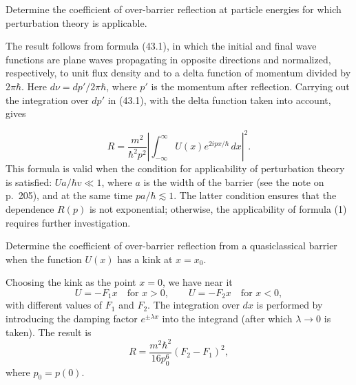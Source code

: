  Determine the coefficient of over-barrier reflection at
particle energies for which perturbation theory is applicable.

\SolutionHeading The result follows from formula (43.1), in which
the initial and final wave functions are plane waves propagating in opposite
directions and normalized, respectively, to unit flux density and to a delta
function of momentum divided by $2\pi\hbar$. Here $d\nu=dp'/2\pi\hbar$, where
$p'$ is the momentum after reflection. Carrying out the integration over
$dp'$ in (43.1), with the delta function taken into account, gives

\begin{equation}
 R=\frac{m^2}{\hbar^2p^2}
 \left|\int_{-\infty}^{\infty}U(x)e^{2ipx/\hbar}\,dx\right|^2.
 \tag{1}
\end{equation}
This formula is valid when the condition for applicability of perturbation
theory is satisfied: $Ua/\hbar v\ll1$, where $a$ is the width of the barrier
(see the note on p.~205), and at the same time $pa/\hbar\lesssim1$. The latter
condition ensures that the dependence $R(p)$ is not exponential; otherwise,
the applicability of formula (1) requires further investigation.

 Determine the coefficient of over-barrier reflection from
a quasiclassical barrier when the function $U(x)$ has a kink at $x=x_0$.

\SolutionHeading 

Choosing the kink as the point $x=0$, we have near it
\[
 U=-F_1x\quad\text{for }x>0,\qquad
 U=-F_2x\quad\text{for }x<0,
\]
with different values of $F_1$ and $F_2$. The integration over $dx$ is
performed by introducing the damping factor $e^{\pm\lambda x}$ into the
integrand (after which $\lambda\to0$ is taken). The result is
\[
 R=\frac{m^2\hbar^2}{16p_0^6}(F_2-F_1)^2,
\]
where $p_0=p(0)$.
